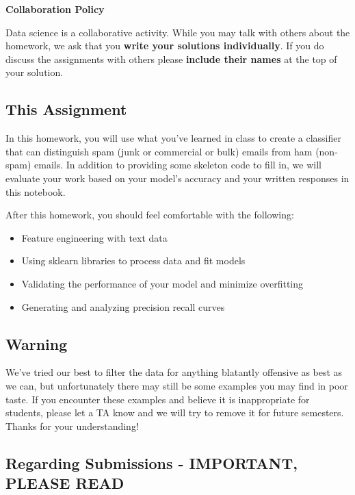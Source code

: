 \documentclass[11pt]{article}
\providecommand{\tightlist}{%
      \setlength{\itemsep}{0pt}\setlength{\parskip}{0pt}}
\begin{document}
\textbf{Collaboration Policy}

Data science is a collaborative activity. While you may talk with others
about the homework, we ask that you \textbf{write your solutions
individually}. If you do discuss the assignments with others please
\textbf{include their names} at the top of your solution.

\subsection{This Assignment}\label{this-assignment}

In this homework, you will use what you've learned in class to create a
classifier that can distinguish spam (junk or commercial or bulk) emails
from ham (non-spam) emails. In addition to providing some skeleton code
to fill in, we will evaluate your work based on your model's accuracy
and your written responses in this notebook.

After this homework, you should feel comfortable with the following:

\begin{itemize}
\tightlist
\item
  Feature engineering with text data
\item
  Using sklearn libraries to process data and fit models
\item
  Validating the performance of your model and minimize overfitting
\item
  Generating and analyzing precision recall curves
\end{itemize}

\subsection{Warning}\label{warning}

We've tried our best to filter the data for anything blatantly offensive
as best as we can, but unfortunately there may still be some examples
you may find in poor taste. If you encounter these examples and believe
it is inappropriate for students, please let a TA know and we will try
to remove it for future semesters. Thanks for your understanding!

\subsection{Regarding Submissions - IMPORTANT, PLEASE
READ}\label{regarding-submissions---important-please-read}
\end{document}
